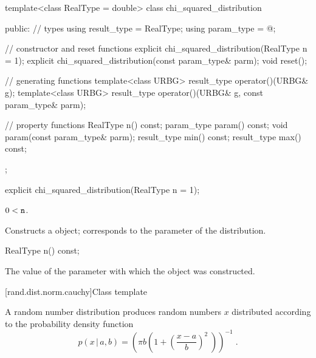 %
\begin{codeblock}
template<class RealType = double>
  class chi_squared_distribution {
  public:
    // types
    using result_type = RealType;
    using param_type  = @\unspec@;

    // constructor and reset functions
    explicit chi_squared_distribution(RealType n = 1);
    explicit chi_squared_distribution(const param_type& parm);
    void reset();

    // generating functions
    template<class URBG>
      result_type operator()(URBG& g);
    template<class URBG>
      result_type operator()(URBG& g, const param_type& parm);

    // property functions
    RealType n() const;
    param_type param() const;
    void param(const param_type& parm);
    result_type min() const;
    result_type max() const;
  };
\end{codeblock}


%
\begin{itemdecl}
explicit chi_squared_distribution(RealType n = 1);
\end{itemdecl}

\begin{itemdescr}
\pnum\requires
 $ 0 < \texttt{\protect n} $.

\pnum\effects Constructs a  object;
 corresponds to the parameter of the distribution.
\end{itemdescr}

%
\begin{itemdecl}
RealType n() const;
\end{itemdecl}

\begin{itemdescr}
\pnum\returns The value of the  parameter
 with which the object was constructed.
\end{itemdescr}


[rand.dist.norm.cauchy]{Class template }%
%
%

\pnum
A  random number distribution
produces random numbers $x$
distributed according to
the probability density function%
%
%
\[%
 p(x\,|\,a,b)
      = \left( \pi b \left( 1 + \left( \frac{x-a}{b}  \right)^2 \;\right)\right)^{-1}
\; \mbox{.}
\]

